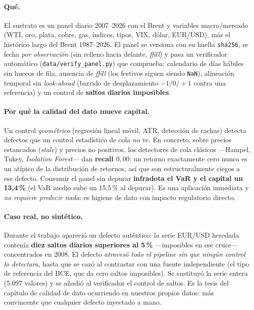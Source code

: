 \documentclass[11pt,a4paper]{article}
\begin{document}
\paragraph{Qué.} El sustrato es un panel diario 2007--2026 con el Brent y
variables macro/mercado (WTI, oro, plata, cobre, gas, índices, tipos, VIX, dólar,
EUR/USD), más el histórico largo del Brent 1987--2026. El panel se versiona con
su huella \texttt{sha256}, se fecha \emph{por observación} (sin relleno hacia
delante, \emph{ffill}) y pasa un verificador automático
(\texttt{data/verify\_panel.py}) que comprueba: calendario de días hábiles sin
huecos de fila, ausencia de \emph{ffill} (los festivos siguen siendo \texttt{NaN}),
alineación temporal sin \emph{look-ahead} (barrido de desplazamiento $-1/0/+1$
contra una referencia) y un control de \textbf{saltos diarios imposibles}.

\paragraph{Por qué la calidad del dato mueve capital.} Un control
\emph{geométrico} (regresión lineal móvil, ATR, detección de rachas) detecta
defectos que un control estadístico de cola \emph{no} ve. En concreto, sobre
precios estancados (\emph{stale}) y precios no positivos, los detectores de cola
clásicos ---Hampel, Tukey, \emph{Isolation Forest}--- dan \textbf{recall
$0{,}00$}: un retorno exactamente cero nunca es un atípico de la distribución de
retornos, así que son estructuralmente ciegos a ese defecto. Consumir el panel
sin depurar \textbf{infradota el VaR y el capital un 13{,}4\,\%} (el VaR medio sube
un 15{,}5\,\% al depurar). Es una aplicación inmediata y \emph{no requiere
predecir nada}: es higiene de dato con impacto regulatorio directo.

\paragraph{Caso real, no sintético.} Durante el trabajo apareció un defecto
auténtico: la serie EUR/USD heredada contenía \textbf{diez saltos diarios
superiores al 5\,\%} ---imposibles en ese cruce--- concentrados en 2008. El
defecto \emph{atravesó todo el pipeline sin que ningún control lo detectara},
hasta que se cazó al contrastar con una fuente independiente (el tipo de
referencia del BCE, que da cero saltos imposibles). Se sustituyó la serie entera
(5.097 valores) y se añadió al verificador el control de saltos. Es la tesis del
capítulo de calidad de dato ocurriendo en nuestros propios datos: más convincente
que cualquier defecto inyectado a mano.
\end{document}
